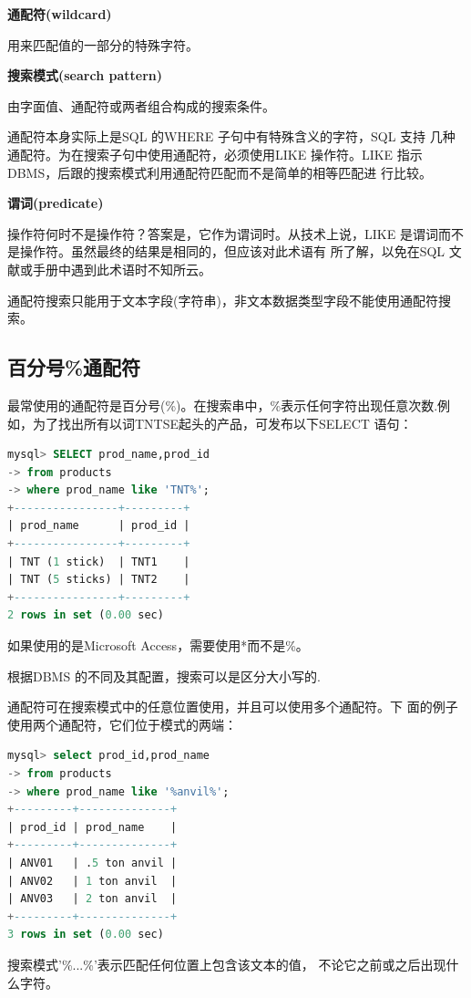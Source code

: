 \documentclass[11pt,a4paper,oneside]{book}
\begin{document}
\begin{tcolorbox}[colback=blue!7!white,colframe=blue!40]
	\textbf{通配符(wildcard)}
	
	用来匹配值的一部分的特殊字符。
\end{tcolorbox}
\begin{tcolorbox}[colback=blue!7!white,colframe=blue!40]
	\textbf{搜索模式(search pattern)}
	
	由字面值、通配符或两者组合构成的搜索条件。
\end{tcolorbox}

通配符本身实际上是SQL 的WHERE 子句中有特殊含义的字符，SQL 支持
几种通配符。为在搜索子句中使用通配符，必须使用LIKE 操作符。LIKE
指示DBMS，后跟的搜索模式利用通配符匹配而不是简单的相等匹配进
行比较。

\begin{tcolorbox}[colback=blue!7!white,colframe=blue!40]
	\textbf{谓词(predicate)}
	
	操作符何时不是操作符？答案是，它作为谓词时。从技术上说，LIKE
	是谓词而不是操作符。虽然最终的结果是相同的，但应该对此术语有
	所了解，以免在SQL 文献或手册中遇到此术语时不知所云。
\end{tcolorbox}

通配符搜索只能用于文本字段(字符串)，非文本数据类型字段不能使用通配符搜索。

\subsection{百分号\%通配符}
最常使用的通配符是百分号(\%)。在搜索串中，\%表示任何字符出现任意次数.例如，为了找出所有以词TNTSE起头的产品，可发布以下SELECT 语句：
\begin{lstlisting}[language=sql]
mysql> SELECT prod_name,prod_id
-> from products
-> where prod_name like 'TNT%';
+----------------+---------+
| prod_name      | prod_id |
+----------------+---------+
| TNT (1 stick)  | TNT1    |
| TNT (5 sticks) | TNT2    |
+----------------+---------+
2 rows in set (0.00 sec)
\end{lstlisting}

如果使用的是Microsoft Access，需要使用*而不是\%。

根据DBMS 的不同及其配置，搜索可以是区分大小写的.

通配符可在搜索模式中的任意位置使用，并且可以使用多个通配符。下
面的例子使用两个通配符，它们位于模式的两端：
\begin{lstlisting}[language=sql]
mysql> select prod_id,prod_name
-> from products
-> where prod_name like '%anvil%';
+---------+--------------+
| prod_id | prod_name    |
+---------+--------------+
| ANV01   | .5 ton anvil |
| ANV02   | 1 ton anvil  |
| ANV03   | 2 ton anvil  |
+---------+--------------+
3 rows in set (0.00 sec)
\end{lstlisting}
搜索模式'\%...\%'表示匹配任何位置上包含该文本的值，
不论它之前或之后出现什么字符。
\end{document}
